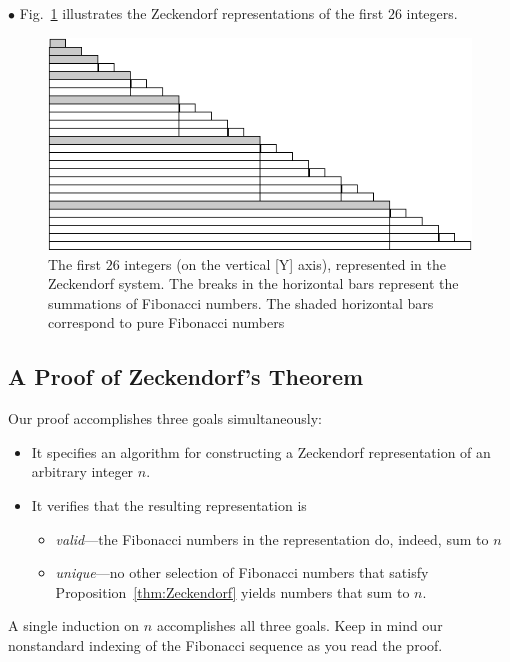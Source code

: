 \noindent $\bullet$
Fig.~\ref{fig:zeckendorf} illustrates the Zeckendorf representations of the first $26$ integers. 
\begin{figure}[h]
\begin{center}
        \includegraphics[scale=0.5]{FiguresArithmetic/Zeckendorf}
        \caption{The first $26$ integers (on the vertical [Y] axis), represented in the Zeckendorf system.  The breaks in the horizontal bars represent the summations of Fibonacci numbers.  The shaded horizontal bars correspond to pure Fibonacci numbers}
\label{fig:zeckendorf}
\end{center}
\end{figure}

\subsection{A Proof of Zeckendorf's Theorem}
\label{sec:Zeckendorf-proof}

Our proof accomplishes three goals simultaneously:
\begin{itemize}
\item
It specifies an algorithm for constructing a Zeckendorf representation of an arbitrary integer $n$.
\item
It verifies that the resulting representation is
  \begin{itemize}
  \item
{\em valid}---the Fibonacci numbers in the representation do, indeed, sum to $n$
  \item
{\em unique}---no other selection of Fibonacci numbers that satisfy Proposition~\ref{thm:Zeckendorf} yields numbers that sum to $n$.
  \end{itemize}
\end{itemize}
A single induction on $n$ accomplishes all three goals.  Keep in mind our nonstandard indexing of the Fibonacci sequence as you read the proof.

